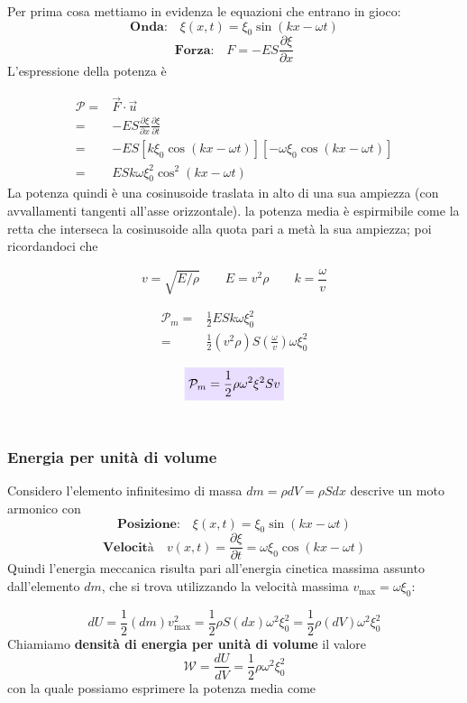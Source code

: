 \documentclass[x11names]{report}
\newcommand{\viola}[1]{\colorbox{yred}{$\displaystyle #1$}}
\begin{document}
	
	\noindent
	Per prima cosa mettiamo in evidenza le equazioni che entrano in gioco:
	\[ 
	\textbf{Onda:} \quad \xi(x,t) = \xi_0\sin\left(kx - \omega t\right)
	\]
	\[ 
	\textbf{Forza:} \quad F = -ES\frac{\partial\xi}{\partial x}
	\]
	L'espressione della potenza è 
	
	\begin{align*}
		\mathcal{P} =& \vec{F} \cdot \vec{u} \\
		=& -ES\frac{\partial\xi}{\partial x}\frac{\partial\xi}{\partial t} \\
		=& -ES\left[k\xi_0\cos\left(kx -\omega t\right)\right]\left[-\omega \xi_0\cos\left(kx -\omega t\right)\right] \\
		=& ESk\omega \xi_0^2\cos^2\left(kx-\omega t\right)
	\end{align*}
	La potenza quindi è una cosinusoide traslata in alto di una sua ampiezza (con avvallamenti tangenti all'asse orizzontale). la potenza media è espirmibile come la retta che interseca la cosinusoide alla quota pari a metà la sua ampiezza; poi ricordandoci che
	
	\[ 
	\boxed{v = \sqrt{E/\rho} \qquad E = v^2 \rho} \qquad \boxed{k = \frac{\omega}{v}}
	\]
	
	\begin{align*}
		\mathcal{P}_m =& \frac{1}{2} ESk\omega \xi_0^2  \\
		=& \frac{1}{2} (v^2 \rho)S\left(\frac{\omega}{v}\right) \omega\xi_0^2 
	\end{align*}
	
	\begin{equation}
		\viola{\mathcal{P}_m = \frac{1}{2}\rho \omega^2 \xi^2 S v}
	\end{equation}
	\\
	
	\subsubsection{Energia per unità di volume}
	Considero l'elemento infinitesimo di massa \(dm = \rho dV = \rho S dx\) descrive un moto armonico con 
	\[ 
	\textbf{Posizione:} \quad \xi(x,t) = \xi_0\sin\left(kx - \omega t\right) 
	\]
	\[ 
	\textbf{Velocità} \quad v(x,t)= \frac{\partial\xi}{\partial t} = \omega \xi_0\cos\left(kx - \omega t\right) 
	\]
	Quindi l'energia meccanica risulta pari all'energia cinetica massima assunto dall'elemento \(dm\), che si trova utilizzando la velocità massima \(v_{\text{max}} = \omega \xi_0\):
	
	\[ 
	dU = \frac{1}{2}(dm)v_{\text{max}}^2 = \frac{1}{2}\rho S (dx)\omega^2 \xi_0^2 = \frac{1}{2}\rho (dV)\omega^2 \xi_0^2
	\]
	Chiamiamo \textbf{densità di energia per unità di volume} il valore 
	\[
	\mathcal{W} = \frac{dU}{dV} = \frac{1}{2}\rho \omega^2\xi_0^2
	\]
	con la quale possiamo esprimere la potenza media come 
	
\end{document}

